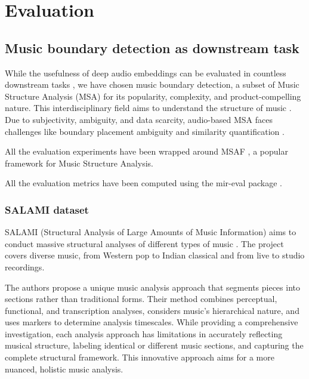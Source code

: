 \chapter{Evaluation}

\section{Music boundary detection as downstream task}

While the usefulness of deep audio embeddings can be evaluated in countless downstream tasks \cite{Li2023MERT:Training, Kim2020OneStrategies}, we have chosen music boundary detection, a subset of Music Structure Analysis (MSA) for its popularity, complexity, and product-compelling nature. This interdisciplinary field aims to understand the structure of music \cite{Nieto2020Audio-BasedApplications}. Due to subjectivity, ambiguity, and data scarcity, audio-based MSA faces challenges like boundary placement ambiguity and similarity quantification \cite{NietoPerceptualMusic}.  

All the evaluation experiments have been wrapped around MSAF \cite{NietoMSAF:FRAMEWORK}, a popular framework for Music Structure Analysis.

All the evaluation metrics have been computed using the mir-eval package \cite{RaffelMir_eval:METRICS}.

\subsection{SALAMI dataset}

SALAMI (Structural Analysis of Large Amounts of Music Information) aims to conduct massive structural analyses of different types of music \cite{Smith2011DESIGNANNOTATIONS}. The project covers diverse music, from Western pop to Indian classical and from live to studio recordings.

The authors propose a unique music analysis approach that segments pieces into sections rather than traditional forms. Their method combines perceptual, functional, and transcription analyses, considers music's hierarchical nature, and uses markers to determine analysis timescales. While providing a comprehensive investigation, each analysis approach has limitations in accurately reflecting musical structure, labeling identical or different music sections, and capturing the complete structural framework. This innovative approach aims for a more nuanced, holistic music analysis.

